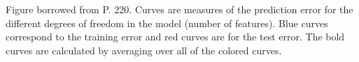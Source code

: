 \label{figure-biasVariance} Figure borrowed from \cite{hastie-elemstatslearn} P. 220. Curves are measures of the prediction error for the different degrees of freedom in the model (number of features). Blue curves correspond to the training error and red curves are for the test error. The bold curves are calculated by averaging over all of the colored curves.